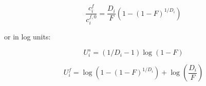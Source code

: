 \documentclass[draft]{agujournal2019}
\begin{document}
\begin{linenomath*}
\begin{equation}
    \frac{c_i^f}{c_i^{f,0}} = \frac{D_i}{F} \left(1 - (1 - F)^{1/D_i}\right)\label{eq:65}
\end{equation}
\end{linenomath*}

or in log units:

\begin{linenomath*}
\begin{equation}
   U_i^s = (1/D_i-1)\log(1 - F)\label{eq:66}
\end{equation}
\end{linenomath*}

\begin{linenomath*}
\begin{equation}
    U_i^f = \log\left(1 - (1 - F)^{1/D_i}\right) + \log\left(\frac{D_i}{F}\right)\label{eq:67}
\end{equation}
\end{linenomath*}
\end{document}
